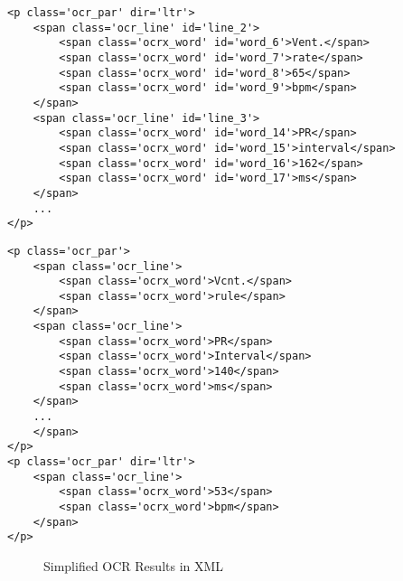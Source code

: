 \newsavebox{\firstlisting}
\begin{lrbox}{\firstlisting}%
\begin{center}
\begin{lstlisting}
<p class='ocr_par' dir='ltr'>
    <span class='ocr_line' id='line_2'>
        <span class='ocrx_word' id='word_6'>Vent.</span> 
        <span class='ocrx_word' id='word_7'>rate</span> 
        <span class='ocrx_word' id='word_8'>65</span> 
        <span class='ocrx_word' id='word_9'>bpm</span> 
    </span>
    <span class='ocr_line' id='line_3'>
        <span class='ocrx_word' id='word_14'>PR</span> 
        <span class='ocrx_word' id='word_15'>interval</span> 
        <span class='ocrx_word' id='word_16'>162</span> 
        <span class='ocrx_word' id='word_17'>ms</span> 
    </span>
    ...
</p> 
\end{lstlisting}
\end{center}
\end{lrbox}
\newsavebox{\secondlisting}
\begin{lrbox}{\secondlisting}
\begin{lstlisting}
<p class='ocr_par'>
    <span class='ocr_line'>
        <span class='ocrx_word'>Vcnt.</span> 
        <span class='ocrx_word'>rule</span> 
    </span>
    <span class='ocr_line'>
        <span class='ocrx_word'>PR</span> 
        <span class='ocrx_word'>Interval</span> 
        <span class='ocrx_word'>140</span> 
        <span class='ocrx_word'>ms</span> 
    </span>
    ...
    </span>
</p>
<p class='ocr_par' dir='ltr'>
    <span class='ocr_line'>
        <span class='ocrx_word'>53</span> 
        <span class='ocrx_word'>bpm</span> 
    </span>
</p>
\end{lstlisting}
\end{lrbox}

\begin{figure}[h]
\caption{Simplified OCR Results in XML}
\centering
\subfloat[a]{
\label{fig:ocrresub:a}
\usebox{\firstlisting}} 
\newline
\subfloat[b]{
\label{fig:ocrresub:b}
\usebox{\secondlisting}}
\label{fig:ocrresult}
\end{figure}

